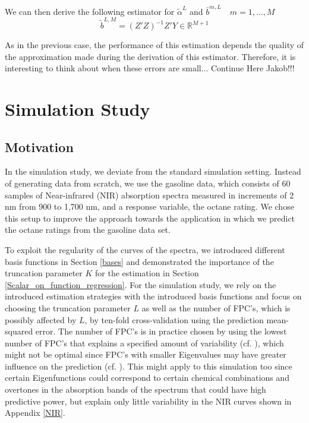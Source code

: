 \documentclass[11pt,twoside,a4paper]{article}
\begin{document}
	We can then derive the following estimator for $\tilde{\alpha}^L$ and $\bar{b}^{m,L} \quad m = 1, \dots, M$
	\begin{equation}
		\tilde{b}^{L,M} = \left(Z'Z\right)^{-1}Z'Y \in \mathbb{R}^{M+1}
	\end{equation}

	As in the previous case, the performance of this estimation depends the quality of the approximation made during the derivation of this estimator. Therefore, it is interesting to think about when these errors are small... {\color{red}Continue Here Jakob!!!}

	\nocite{alexanderian_KLexpansion_2015}
	\nocite{kokoszka_introduction_2017}
	\nocite{hsing_theoretical_2015}
	\nocite{ramsay_functional_2005}
	\nocite{horvath_inference_2012}
	\nocite{cai_prediction_2006}
	\nocite{levitin_introduction_2007}

	\section{Simulation Study}\label{Simulation}

	\subsection{Motivation}
	
	In the simulation study, we deviate from the standard simulation setting. Instead of generating data from scratch, we use the gasoline data, which consists of 60 samples of Near-infrared (NIR) absorption spectra measured in increments of 2 nm from 900 to 1,700 nm, and a response variable, the octane rating. We chose this setup to improve the approach towards the application in which we predict the octane ratings from the gasoline data set.	
	
	To exploit the regularity of the curves of the spectra, we introduced different basis functions in Section \ref{bases} and demonstrated the importance of the truncation parameter $K$ for the estimation in Section \ref{Scalar_on_function_regression}. For the simulation study, we rely on the introduced estimation strategies with the introduced basis functions and focus on choosing the truncation parameter $L$ as well as the number of FPC's, which is possibly affected by $L$, by ten-fold cross-validation using the prediction mean-squared error. The number of FPC's is in practice chosen by using the lowest number of FPC's that explains a specified amount of variability (cf. \cite{kokoszka_introduction_2017}), which might not be optimal since FPC's with smaller Eigenvalues may have greater influence on the prediction (cf. \cite{Jolliffe_1982}). This might apply to this simulation too since certain Eigenfunctions could correspond to certain chemical combinations and overtones in the absorption bands of the spectrum that could have high predictive power, but explain only little variability in the NIR curves shown in Appendix \ref{NIR}.\\
	 
\end{document}
